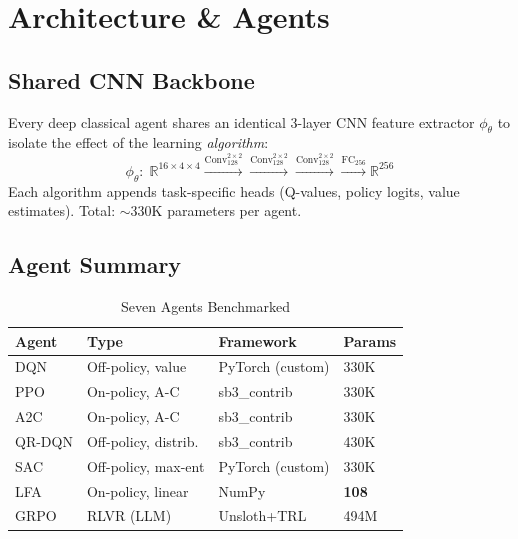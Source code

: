 \documentclass[conference, 10pt]{IEEEtran}
\begin{document}
\section{Architecture \& Agents}
\label{sec:agents}

\subsection{Shared CNN Backbone}
Every deep classical agent shares an identical 3-layer CNN feature extractor $\phi_\theta$ to isolate the effect of the learning \emph{algorithm}:
\begin{equation}
\phi_\theta:\; \mathbb{R}^{16\times 4\times 4}
\!\xrightarrow{\text{Conv}_{128}^{2\times 2}}
\!\xrightarrow{\text{Conv}_{128}^{2\times 2}}
\!\xrightarrow{\text{Conv}_{128}^{2\times 2}}
\!\xrightarrow{\text{FC}_{256}}
\mathbb{R}^{256}
\end{equation}
Each algorithm appends task-specific heads (Q-values, policy logits, value estimates).  Total: $\sim$330K parameters per agent.

\subsection{Agent Summary}

\begin{table}[h]
\centering
\caption{Seven Agents Benchmarked}
\label{tab:agents}
\setlength{\tabcolsep}{3pt}
\begin{tabular}{@{}llll@{}}
\toprule
\textbf{Agent} & \textbf{Type} & \textbf{Framework} & \textbf{Params} \\
\midrule
\rowcolor{highlight} DQN & Off-policy, value & PyTorch (custom) & 330K \\
PPO & On-policy, A-C & sb3\_contrib & 330K \\
A2C & On-policy, A-C & sb3\_contrib & 330K \\
QR-DQN & Off-policy, distrib. & sb3\_contrib & 430K \\
SAC & Off-policy, max-ent & PyTorch (custom) & 330K \\
\rowcolor{highlight} LFA & On-policy, linear & NumPy & \textbf{108} \\
\rowcolor{highlight} GRPO & RLVR (LLM) & Unsloth+TRL & 494M \\
\bottomrule
\end{tabular}
\end{table}
\end{document}
